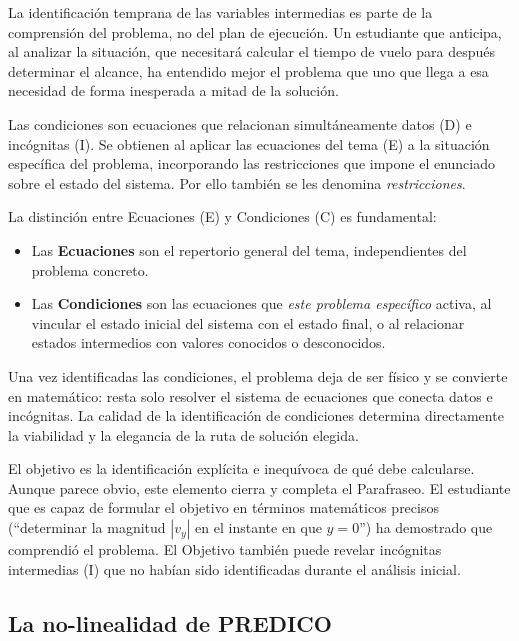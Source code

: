 \documentclass[11pt]{book}
\begin{document}
\begin{enumerate}
La identificación temprana de las variables intermedias es parte de la comprensión del problema, no del plan de ejecución. Un estudiante que anticipa, al analizar la situación, que necesitará calcular el tiempo de vuelo para después determinar el alcance, ha entendido mejor el problema que uno que llega a esa necesidad de forma inesperada a mitad de la solución.

\medskip
{}
\medskip

Las condiciones son ecuaciones que relacionan simultáneamente datos (D) e incógnitas (I). Se obtienen al aplicar las ecuaciones del tema (E) a la situación específica del problema, incorporando las restricciones que impone el enunciado sobre el estado del sistema. Por ello también se les denomina {\it restricciones}.

La distinción entre Ecuaciones (E) y Condiciones (C) es fundamental:
\begin{itemize}
    \item Las {\bf Ecuaciones} son el repertorio general del tema, independientes del problema concreto.
    \item Las {\bf Condiciones} son las ecuaciones que {\it este problema específico} activa, al vincular el estado inicial del sistema con el estado final, o al relacionar estados intermedios con valores conocidos o desconocidos.
\end{itemize}

Una vez identificadas las condiciones, el problema deja de ser físico y se convierte en matemático: resta solo resolver el sistema de ecuaciones que conecta datos e incógnitas. La calidad de la identificación de condiciones determina directamente la viabilidad y la elegancia de la ruta de solución elegida.

\medskip
{}
\medskip

El objetivo es la identificación explícita e inequívoca de qué debe calcularse. Aunque parece obvio, este elemento cierra y completa el Parafraseo. El estudiante que es capaz de formular el objetivo en términos matemáticos precisos (``determinar la magnitud $|v_y|$ en el instante en que $y = 0$'') ha demostrado que comprendió el problema. El Objetivo también puede revelar incógnitas intermedias (I) que no habían sido identificadas durante el análisis inicial.

\subsection*{La no-linealidad de PREDICO}


\end{enumerate}
\end{document}

